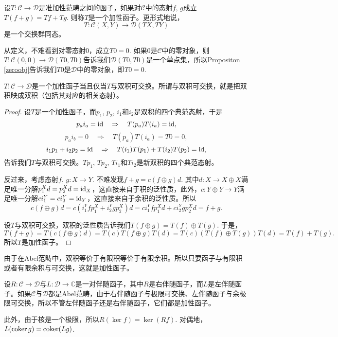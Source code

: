 \begin{para}
设$T:\mathcal{C}\to \mathcal{D}$是准加性范畴之间的函子，如果对$\mathcal{C}$中的态射$f$, $g$成立$T(f+g)=Tf+Tg$. 则称$T$是一个加性函子。更形式地说，
\[
	T:\mathcal{C}(X,Y)\to \mathcal{D}(TX,TY)
\]
是一个交换群同态。
\end{para}

从定义，不难看到对零态射$0$，成立$T0=0$. 如果$0$是$\mathcal{C}$中的零对象，则$T:\mathcal{C}(0,0)\to \mathcal{D}(T0,T0)$告诉我们$\mathcal{D}(T0,T0)$是一个单点集，所以Propositon \ref{zeroobj}告诉我们$T0$是$\mathcal{D}$中的零对象，即$T0=0$.

\begin{pro}
$T:\mathcal{C}\to \mathcal{D}$是一个加性函子当且仅当$T$与双积可交换。所谓与双积可交换，就是把双积映成双积（包括其对应的相关态射）。
\end{pro}

\begin{proof}
设$T$是一个加性函子，而$p_1$, $p_2$, $i_1$和$i_2$是双积的四个典范态射，于是
\[
	p_ai_a = \operatorname{id} \quad \Rightarrow \quad T(p_a)T(i_a) = \operatorname{id},
\]
\[
	p_ai_b = 0 \quad \Rightarrow \quad T(p_a)T(i_a) = T0=0,
\]
\[
	i_1p_1+i_2p_2 = \operatorname{id} \quad \Rightarrow \quad T(i_1)T(p_1)+T(i_2)T(p_2) = \operatorname{id},
\]
告诉我们$T$与双积可交换。$Tp_1$, $Tp_2$, $Ti_1$和$Ti_2$是新双积的四个典范态射。

反过来，考虑态射$f$, $g:X\to Y$. 不难发现$f+g=c(f\oplus g)d$. 其中$d:X\to X\oplus X$满足唯一分解$p^X_1d=p^X_2d=\operatorname{id}_X$，这直接来自于积的泛性质，此外，$c:Y\oplus Y\to Y$满足唯一分解$ci^Y_1=ci^Y_2=\operatorname{id}_Y$，这直接来自于余积的泛性质。所以
\[
	c(f\oplus g)d=c(i_1^Y f p_1^X+i_2^Y g p_2^X)d=c i_1^Y f p_1^X d+ ci_2^Y g p_2^Xd=f+g.
\]

设$T$与双积可交换，双积的泛性质告诉我们$T(f\oplus g)=T(f)\oplus T(g)$. 于是，
\[
	T(f+g)=T(c(f\oplus g)d)=T(c)T(f\oplus g)T(d)=T(c)(T(f)\oplus T(g))T(d)=T(f)+T(g).
\]
所以$T$是加性函子。
\end{proof}

由于在Abel范畴中，双积等价于有限积等价于有限余积。所以只要函子与有限积或者有限余积与可交换，这就是加性函子。

\begin{para}
设$R:\mathcal{C}\to \mathcal{D}$与$L:\mathcal{D}\to \mathbb{C}$是一对伴随函子，其中$R$是右伴随函子，而$L$是左伴随函子。如果$\mathcal{C}$与$\mathcal{D}$都是Abel范畴，由于右伴随函子与极限可交换、左伴随函子与余极限可交换，所以不管左伴随函子还是右伴随函子，它们都是加性函子。

此外，由于核是一个极限，所以$R(\ker f)= \ker(Rf)$. 对偶地，$L(\operatorname{coker} g)= \operatorname{coker}(Lg)$.
\end{para}

